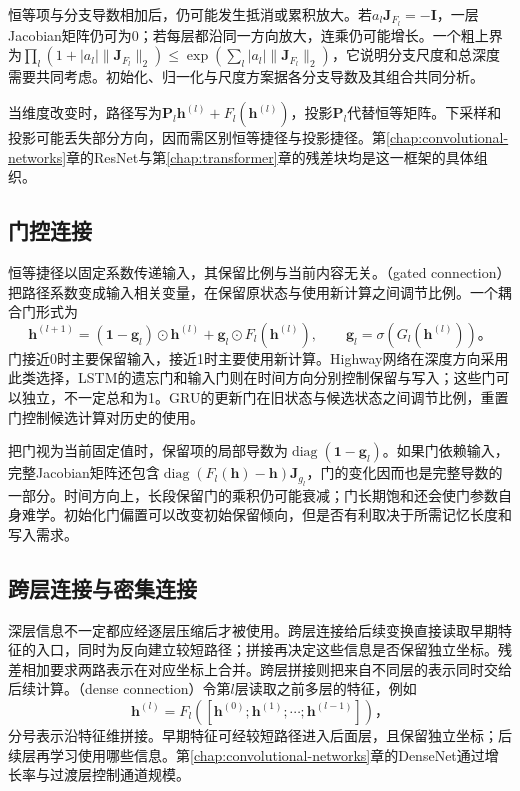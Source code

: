 恒等项与分支导数相加后，仍可能发生抵消或累积放大。若$a_l\bm J_{F_l}=-\bm I$，一层Jacobian矩阵仍可为0；若每层都沿同一方向放大，连乘仍可能增长。一个粗上界为$\prod_l(1+|a_l|\lVert\bm J_{F_l}\rVert_2)\leq\exp(\sum_l|a_l|\lVert\bm J_{F_l}\rVert_2)$，它说明分支尺度和总深度需要共同考虑。初始化、归一化与尺度方案据各分支导数及其组合共同分析。

当维度改变时，路径写为$\bm P_l\bm h^{(l)}+F_l(\bm h^{(l)})$，投影$\bm P_l$代替恒等矩阵。下采样和投影可能丢失部分方向，因而需区别恒等捷径与投影捷径。第\ref{chap:convolutional-networks}章的ResNet与第\ref{chap:transformer}章的残差块均是这一框架的具体组织。

\subsection{门控连接}
\label{sec:training-gates}

恒等捷径以固定系数传递输入，其保留比例与当前内容无关。（gated connection）把路径系数变成输入相关变量，在保留原状态与使用新计算之间调节比例。一个耦合门形式为
\begin{equation}
  \bm h^{(l+1)}=(\bm1-\bm g_l)\odot\bm h^{(l)}
                   +\bm g_l\odot F_l(\bm h^{(l)}),
  \qquad\bm g_l=\sigma(G_l(\bm h^{(l)}))\text{。}
  \label{eq:training-gated-connection}
\end{equation}
门接近0时主要保留输入，接近1时主要使用新计算。Highway网络在深度方向采用此类选择，LSTM的遗忘门和输入门则在时间方向分别控制保留与写入；这些门可以独立，不一定总和为1。GRU的更新门在旧状态与候选状态之间调节比例，重置门控制候选计算对历史的使用。

把门视为当前固定值时，保留项的局部导数为$\operatorname{diag}(\bm1-\bm g_l)$。如果门依赖输入，完整Jacobian矩阵还包含$\operatorname{diag}(F_l(\bm h)-\bm h)\bm J_{g_l}$，门的变化因而也是完整导数的一部分。时间方向上，长段保留门的乘积仍可能衰减；门长期饱和还会使门参数自身难学。初始化门偏置可以改变初始保留倾向，但是否有利取决于所需记忆长度和写入需求。

\subsection{跨层连接与密集连接}
\label{sec:training-dense-connections}

深层信息不一定都应经逐层压缩后才被使用。跨层连接给后续变换直接读取早期特征的入口，同时为反向建立较短路径；拼接再决定这些信息是否保留独立坐标。残差相加要求两路表示在对应坐标上合并。跨层拼接则把来自不同层的表示同时交给后续计算。（dense connection）令第$l$层读取之前多层的特征，例如
\begin{equation}
  \bm h^{(l)}=F_l([\bm h^{(0)};\bm h^{(1)};\cdots;\bm h^{(l-1)}])\text{，}
  \label{eq:training-dense-concat}
\end{equation}
分号表示沿特征维拼接。早期特征可经较短路径进入后面层，且保留独立坐标；后续层再学习使用哪些信息。第\ref{chap:convolutional-networks}章的DenseNet通过增长率与过渡层控制通道规模。

